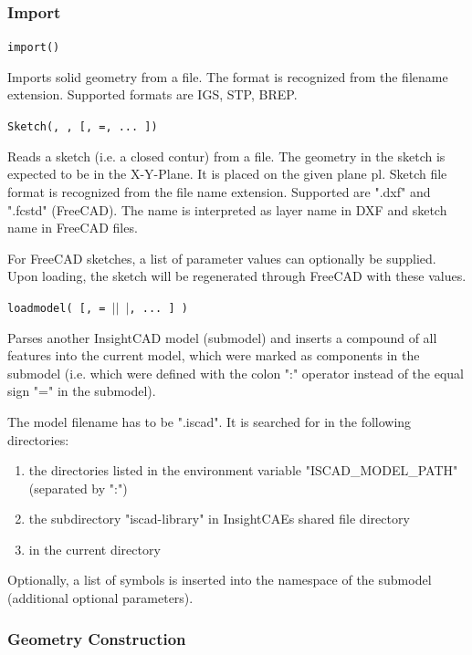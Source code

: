 \subsubsection{Import}

\texttt{import()}

Imports solid geometry from a file. The format is recognized from the
filename extension. Supported formats are IGS, STP, BREP.

\texttt{Sketch(, ,  [, =, ... ])}

Reads a sketch (i.e. a closed contur) from a file. The geometry in the
sketch is expected to be in the X-Y-Plane. It is placed on the given
plane pl. Sketch file format is recognized from the file name
extension. Supported are ".dxf" and ".fcstd" (FreeCAD). The name is
interpreted as layer name in DXF and sketch name in FreeCAD files.

For FreeCAD sketches, a list of parameter values can optionally be
supplied. Upon loading, the sketch will be regenerated through FreeCAD
with these values.

\texttt{loadmodel(  [,  = $|$$|$ $|$, ... ] )}

Parses another InsightCAD model (submodel) and inserts a
compound of all features into the current model, which were marked as
components in the submodel (i.e. which were defined with the colon ":"
operator instead of the equal sign "=" in the submodel).

The model filename has to be ".iscad". It is searched
for in the following directories:

\begin{enumerate}
\item the directories listed in the environment variable
    "ISCAD\_MODEL\_PATH" (separated by ":")
\item the subdirectory "iscad-library" in InsightCAEs shared file
    directory
\item in the current directory
\end{enumerate}

Optionally, a list of symbols is inserted into the namespace of the
submodel (additional optional parameters).

\subsubsection{Geometry Construction}

